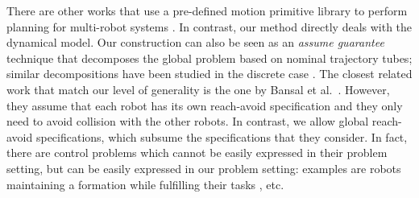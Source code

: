 There are other works that use a pre-defined motion primitive library to perform planning for multi-robot 
systems \cite{saha2016implan,BanusicMPSZ19pgcd,Gavran2017antlab,desai2017drona}. 
In contrast, our method directly deals with the dynamical model. 
Our construction can also be seen as an \emph{assume guarantee} technique that decomposes the global problem based on nominal trajectory tubes; similar decompositions have been studied in the discrete case \cite{alur2015pattern,majumdarassume}.
The closest related work that match our level of generality is the one by Bansal et al.\ \cite{bansal2017safe}.
However, they assume that each robot has its own reach-avoid specification and they only need to avoid collision with the other robots.
In contrast, we allow global reach-avoid specifications, which subsume the specifications that they consider.
In fact, there are control problems which cannot be easily expressed in their problem setting, but can be easily expressed in our problem setting: 
examples are robots maintaining a formation while fulfilling their tasks \cite{alonso2019distributed}, etc.
 

%	

